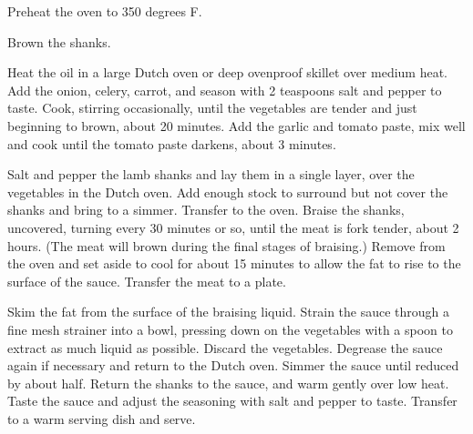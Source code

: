 Preheat the oven to 350 degrees F. 

Brown the shanks.

Heat the oil in a large Dutch oven or deep ovenproof skillet over medium heat. 
Add the onion, celery, carrot, and season with 2 teaspoons salt and pepper to taste. 
Cook, stirring occasionally, until the vegetables are tender and just beginning to brown, about 20 minutes. 
Add the garlic and tomato paste, mix well and cook until the tomato paste darkens, about 3 minutes.

Salt and pepper the lamb shanks and lay them in a single layer, over the vegetables in the Dutch oven. 
Add enough stock to surround but not cover the shanks and bring to a simmer. 
Transfer to the oven. Braise the shanks, uncovered, turning every 30 minutes or so, until the meat 
is fork tender, about 2 hours. (The meat will brown during the final stages of braising.) 
Remove from the oven and set aside to cool for about 15 minutes to allow the fat to rise to the surface of the sauce. 
Transfer the meat to a plate.

Skim the fat from the surface of the braising liquid. 
Strain the sauce through a fine mesh strainer into a bowl, pressing down on the vegetables with a 
spoon to extract as much liquid as possible. Discard the vegetables. 
Degrease the sauce again if necessary and return to the Dutch oven. 
Simmer the sauce until reduced by about half. Return the shanks to the sauce, and warm gently over low heat. 
Taste the sauce and adjust the seasoning with salt and pepper to taste. Transfer to a warm serving dish and serve.